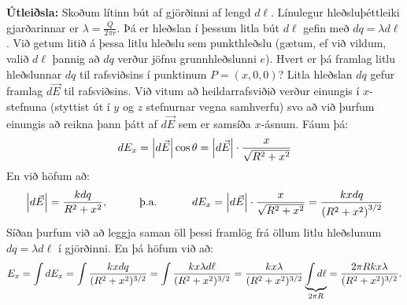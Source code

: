 \ifdefined \wholebook \else\documentclass[oneside]{book}\usepackage{EdlBook}\graphicspath{{figures/}}
\begin{document}
\begin{figure}[H]
    \centering
\end{figure}

\textbf{Útleiðsla:} Skoðum lítinn bút af gjörðinni af lengd $d\ell$. Línulegur hleðsluþéttleiki gjarðarinnar er $\lambda = \frac{Q}{2\pi r}$. Þá er hleðslan í þessum litla bút $d\ell$ gefin með $dq = \lambda d\ell$. Við getum litið á þessa litlu hleðslu sem punkthleðslu (gætum, ef við vildum, valið $d\ell$ þannig að $dq$ verður jöfnu grunnhleðslunni $e$). Hvert er þá framlag litlu hleðslunnar $dq$ til rafsviðsins í punktinum $P = (x,0,0)$? Litla hleðslan $dq$ gefur framlag $d\vec{E}$ til rafsviðsins. Við vitum að heildarrafsviðið verður einungis í $x$-stefnuna (styttist út í $y$ og $z$ stefnurnar vegna samhverfu) svo að við þurfum einungis að reikna þann þátt af $d\vec{E}$ sem er samsíða $x$-ásnum. Fáum þá:
\begin{align*}
    dE_x = \abs{d\vec{E}} \cos\theta = \abs{d\vec{E}} \cdot \frac{x}{\sqrt{R^2 + x^2}}
\end{align*}
En við höfum að:
\begin{align*}
    \abs{d\vec{E}} = \frac{kdq}{R^2 + x^2}, \hspace{1cm} \text{þ.a.~} \hspace{1cm} dE_x = \abs{d\vec{E}} \cdot \frac{x}{\sqrt{R^2 + x^2}} = \frac{kxdq}{\left(R^2 + x^2 \right)^{3/2}}
\end{align*}
Síðan þurfum við að leggja saman öll þessi framlög frá öllum litlu hleðslunum $dq = \lambda d\ell$ í gjörðinni. En þá höfum við að:
\begin{align*}
    E_x = \int dE_x = \int \frac{kxdq}{(R^2 + x^2)^{3/2}} = \int \frac{kx\lambda d\ell}{(R^2 + x^2)^{3/2}} = \frac{kx\lambda}{(R^2 + x^2)^{3/2}} \underbrace{\int d\ell }_\textrm{$2\pi R$} = \frac{2\pi R k x \lambda}{(R^2 + x^2)^{3/2}}.
\end{align*}
  
\end{document}
